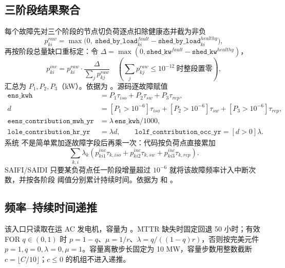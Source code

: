 \subsection{三阶段结果聚合}

每个故障先对三个阶段的节点切负荷逐点扣除健康态并截为非负
\begin{equation}
 p^{raw}_{ki}=\max\!\big(0,\ \texttt{shed\_by\_load}^{fault}_{ki}-\texttt{shed\_by\_load}^{healthy}_{ki}\big),
\end{equation}
再按阶段总量缺口重标定：令
$\Delta=\max(0,\texttt{shed\_kw}^{fault}-\texttt{shed\_kw}^{healthy})$，
\begin{equation}
 p^{inc}_{ki}=p^{raw}_{ki}\cdot\frac{\Delta}{\sum_j p^{raw}_{kj}}
 \quad\left(\sum_j p^{raw}_{kj}\le10^{-12}\ \text{时整段置零}\right),
\end{equation}
汇总为 $P_1,P_2,P_3$（kW）。依据为
。源码逐故障赋值
\begin{align}
 \texttt{ens\_kwh}&=P_1\tau_{iso}+P_2\tau_{sw}+P_3\tau_{rep},\\
 d&=[P_1>10^{-6}]\tau_{iso}+[P_2>10^{-6}]\tau_{sw}
 +[P_3>10^{-6}]\tau_{rep},\\
 \texttt{eens\_contribution\_mwh\_yr}&=\lambda\,
 \texttt{ens\_kwh}/1000,\\
 \texttt{lole\_contribution\_hr\_yr}&=\lambda d,\qquad
 \texttt{lolf\_contribution\_occ\_yr}=[d>0]\lambda.
\end{align}
系统  不是简单累加逐故障字段后再乘一次：代码按负荷点直接累加
\begin{equation}
 \sum_{k,i}\lambda_k
 (p_{ki1}^{inc}\tau_{k,iso}+p_{ki2}^{inc}\tau_{k,sw}+p_{ki3}^{inc}\tau_{k,rep}).
\end{equation}
SAIFI/SAIDI 只要某负荷点任一阶段增量超过 $10^{-6}$ 就将该故障频率计入中断次数，并按各阶段
阈值分别累计持续时间。依据为
 和
。

\subsection{频率--持续时间递推}

该入口只读取在运 AC 发电机，容量为 。MTTR 缺失时固定回退 50 小时；有效 FOR
$q\in(0,1)$ 时 $p=1-q$、$\mu=1/r$、$\lambda=q/((1-q)r)$，否则按完美元件
$p=1,q=0,\lambda=0,\mu=1$。容量离散步长固定为 10 MW，容量步数用整数截断
$c=\lfloor C/10\rfloor$；$c\le0$ 的机组不进入递推。

